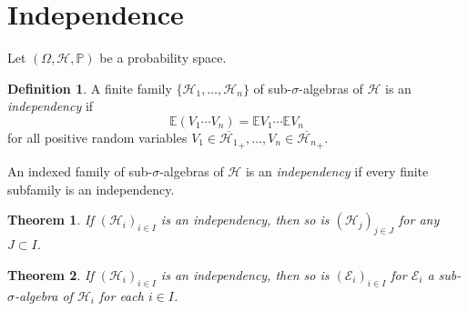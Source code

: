 \documentclass[11pt, a4paper, openany]{book}
\newtheorem{thm}{Theorem}\newtheorem{lem}{Lemma}\newtheorem{crl}{Corollary}
\theoremstyle{definition}
\newtheorem{define}{Definition}\newtheorem{exam}{Example}\newtheorem{remark}{Remark}
\begin{document}
\section{Independence}
    Let $(\Omega,\mathscr{H},\mathbb{P})$ be a probability space.
    \begin{define}
        A finite family $\{\mathscr{H}_1,\dots,\mathscr{H}_n\}$ of sub-$\sigma$-algebras of $\mathscr{H}$ is an \textit{independency} if
        \[
            \mathbb{E}(V_1\cdots V_n)=\mathbb{E}V_1\cdots \mathbb{E}V_n
        \]
        for all positive random variables $V_1\in \overline{\mathscr{H}_1}_+,\dots,V_n\in \overline{\mathscr{H}_n}_+$.

        An indexed family of sub-$\sigma$-algebras of $\mathscr{H}$ is an \textit{independency} if every finite subfamily is an independency.
    \end{define}
    \begin{thm}\label{subfamily of an independency is independent}
        If $(\mathscr{H}_i)_{i\in I}$ is an independency, then so is $(\mathscr{H}_j)_{j\in J}$ for any $J\subset I$.
    \end{thm}
    \begin{thm}\label{sub-sigma-algebra of an independency is independent}
        If $(\mathscr{H}_i)_{i\in I}$ is an independency, then so is $(\mathscr{E}_i)_{i\in I}$ for $\mathscr{E}_i$ a sub-$\sigma$-algebra of $\mathscr{H}_i$ for each $i\in I$.
    \end{thm}
\end{document}
